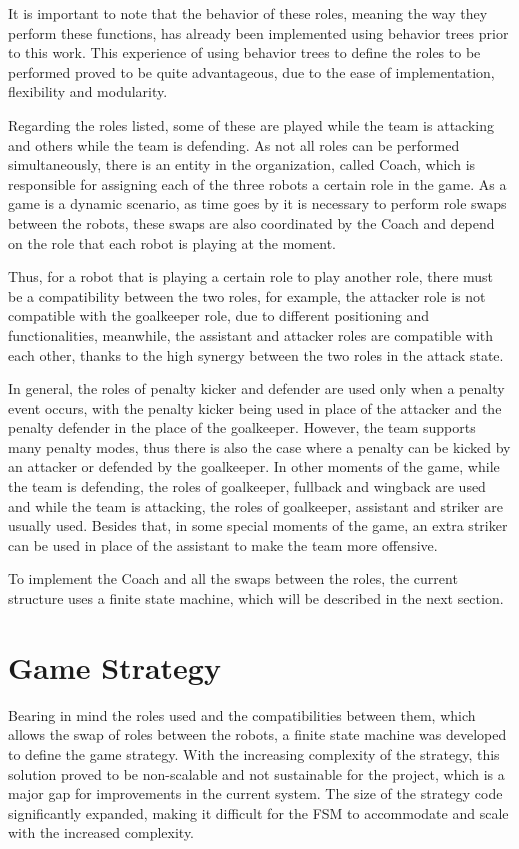 It is important to note that the behavior of these roles, meaning the way they perform these functions, has already been implemented using behavior trees prior to this work. This experience of using behavior trees to define the roles to be performed proved to be quite advantageous, due to the ease of implementation, flexibility and modularity.

Regarding the roles listed, some of these are played while the team is attacking and others while the team is defending. As not all roles can be performed simultaneously, there is an entity in the organization, called Coach, which is responsible for assigning each of the three robots a certain role in the game. As a game is a dynamic scenario, as time goes by it is necessary to perform role swaps between the robots, these swaps are also coordinated by the Coach and depend on the role that each robot is playing at the moment.

Thus, for a robot that is playing a certain role to play another role, there must be a compatibility between the two roles, for example, the attacker role is not compatible with the goalkeeper role, due to different positioning and functionalities, meanwhile, the assistant and attacker roles are compatible with each other, thanks to the high synergy between the two roles in the attack state.

In general, the roles of penalty kicker and defender are used only when a penalty event occurs, with the penalty kicker being used in place of the attacker and the penalty defender in the place of the goalkeeper. However, the team supports many penalty modes, thus there is also the case where a penalty can be kicked by an attacker or defended by the goalkeeper. In other moments of the game, while the team is defending, the roles of goalkeeper, fullback and wingback are used and while the team is attacking, the roles of goalkeeper, assistant and striker are usually used. Besides that, in some special moments of the game, an extra striker can be used in place of the assistant to make the team more offensive. 

To implement the Coach and all the swaps between the roles, the current structure uses a finite state machine, which will be described in the next section.  

\section{Game Strategy}

Bearing in mind the roles used and the compatibilities between them, which allows the swap of roles between the robots, a finite state machine was developed to define the game strategy. With the increasing complexity of the strategy, this solution proved to be non-scalable and not sustainable for the project, which is a major gap for improvements in the current system. The size of the strategy code significantly expanded, making it difficult for the FSM to accommodate and scale with the increased complexity.

